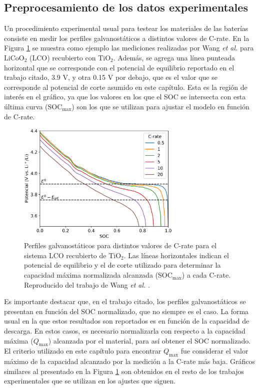 \subsection{Preprocesamiento de los datos experimentales}

Un procedimiento experimental usual para testear los materiales de las baterías
consiste en medir los perfiles galvanostáticos a distintos valores de C-rate.
En la Figura \ref{fig:preproc} se muestra como ejemplo las mediciones realizadas
por Wang \textit{et al.} \cite{wang2019high} para LiCoO$_2$ (LCO) recubierto con 
TiO$_2$. Además, se agrega una línea punteada horizontal que se corresponde
con el potencial de equilibrio reportado en el trabajo citado, 3.9 V, y otra
0.15 V por debajo, que es el valor que se corresponde al potencial de corte
asumido en este capítulo. Esta es la región de interés en el gráfico, ya que 
los valores en los que el SOC se intersecta con esta última curva (SOC$_{\max}$)
son los que se utilizan para ajustar el modelo en función de C-rate.

\begin{figure}[h!]
    \centering
    \includegraphics[width=0.7\textwidth]{FastCharging/un/resultados/preprocesamiento/preprocesamiento.png}
    \caption{Perfiles galvanostáticos para distintos valores de C-rate para el
    sistema LCO recubierto de TiO$_2$. Las líneas horizontales indican el 
    potencial de equilibrio y el de corte utilizado para determinar la 
    capacidad máxima normalizada alcanzada (SOC$_{\max}$) a cada C-rate. 
    Reproducido del trabajo de Wang \textit{et al.} \cite{wang2019high}.}
    \label{fig:preproc}
\end{figure}

Es importante destacar que, en el trabajo citado, los perfiles galvanostáticos
se presentan en función del SOC normalizado, que no siempre es el caso. La 
forma usual en la que estos resultados son reportados es en función de la 
capacidad de descarga. En estos casos, es necesario normalizarla con respecto
a la capacidad máxima ($Q_{\max}$) alcanzada por el material, para así obtener
el SOC normalizado. El criterio utilizado en este capítulo para encontrar 
$Q_{\max}$ fue considerar el valor máximo de la capacidad alcanzado por la 
medición a la C-rate más baja. Gráficos similares al presentado en la Figura 
\ref{fig:preproc} son obtenidos en el resto de los trabajos experimentales que
se utilizan en los ajustes que siguen.

